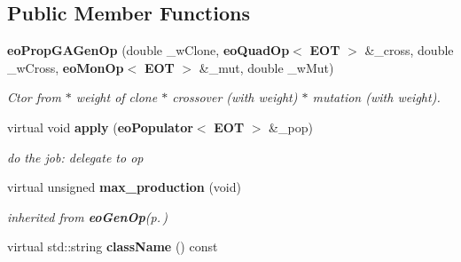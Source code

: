 \subsection*{Public Member Functions}
\begin{CompactItemize}
\item 
{\bf eo\-Prop\-GAGen\-Op} (double \_\-w\-Clone, {\bf eo\-Quad\-Op}$<$ {\bf EOT} $>$ \&\_\-cross, double \_\-w\-Cross, {\bf eo\-Mon\-Op}$<$ {\bf EOT} $>$ \&\_\-mut, double \_\-w\-Mut)\label{classeo_prop_g_a_gen_op_a0}

\begin{CompactList}\small\item\em Ctor from $\ast$ weight of clone $\ast$ crossover (with weight) $\ast$ mutation (with weight). \item\end{CompactList}\item 
virtual void {\bf apply} ({\bf eo\-Populator}$<$ {\bf EOT} $>$ \&\_\-pop)\label{classeo_prop_g_a_gen_op_a1}

\begin{CompactList}\small\item\em do the job: delegate to op \item\end{CompactList}\item 
virtual unsigned {\bf max\_\-production} (void)\label{classeo_prop_g_a_gen_op_a2}

\begin{CompactList}\small\item\em inherited from {\bf eo\-Gen\-Op}{\rm (p.\,\pageref{classeo_gen_op})} \item\end{CompactList}\item 
virtual std::string {\bf class\-Name} () const \label{classeo_prop_g_a_gen_op_a3}

\end{CompactItemize}

